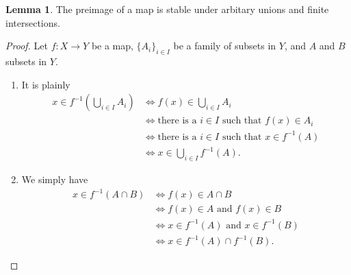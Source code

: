 \documentclass[a4paper]{article}
\theoremstyle{definition}
\newtheorem*{lemma}{Lemma}
\begin{document}
\begin{lemma}
    The preimage of a map is stable under arbitary unions and finite intersections.
\end{lemma}
\begin{proof}
    Let \(f: X \longrightarrow Y\) be a map, \(\{A_i\}_{i \in I}\) be a family of subsets in \(Y\), and \(A\) and \(B\) subsets in \(Y\).
    \begin{enumerate}
        \item It is plainly
        \begin{align*}
            x \in f^{-1} \left(\bigcup_{i \in I}A_i\right) &\iff f(x) \in \bigcup_{i \in I}A_i \\
            &\iff \text{there is a \(i \in I\) such that } f(x) \in A_i \\
            &\iff \text{there is a \(i \in I\) such that } x \in f^{-1}(A) \\
            &\iff x \in \bigcup_{i \in I} f^{-1}(A) \text{.}
        \end{align*}
        \item We simply have
        \begin{align*}
            x \in f^{-1}(A \cap B) &\iff f(x) \in A \cap B \\
            &\iff f(x) \in A \text{ and } f(x) \in B\\
            &\iff x \in f^{-1}(A) \text{ and } x \in f^{-1}(B)\\
            &\iff x \in f^{-1}(A) \cap f^{-1}(B) \text{.}
        \end{align*}
    \end{enumerate}
\end{proof}
\end{document}
